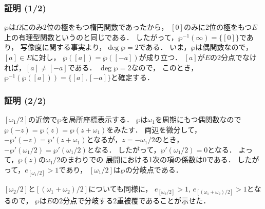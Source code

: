 \documentclass[dvipdfmx,12pt,aspectratio=169]{beamer}%
\begin{document}
\begin{frame}
    \frametitle{証明 (1/2)}

    $\wp$は$\Omega$にのみ2位の極をもつ楕円関数であったから，
    $[0]$のみに2位の極をもつ$E$上の有理型関数というのと同じである．
    したがって，$\wp^{-1}(\infty)=\{[0]\}$であり，
    写像度に関する事実より，$\deg\wp=2$である．
    いま，$\wp$は偶関数なので，$[a]\in E$に対し，
    $\wp([a])=\wp([-a])$が成り立つ．
    $[a]$が$E$の2分点でなければ，$[a]\neq[-a]$である．
    $\deg\wp=2$なので，
    このとき，$\wp^{-1}(\wp([a]))=\{[a],[-a]\}$と確定する．
\end{frame}

\begin{frame}
    \frametitle{証明 (2/2)}

    $[\omega_1/2]$の近傍で$\wp$を局所座標表示する．
    $\wp$は$\omega_1$を周期にもつ偶関数なので
    $\wp(-z)=\wp(z)=\wp(z+\omega_1)$をみたす．
    両辺を微分して，
    $-\wp'(-z)=\wp'(z+\omega_1)$となるが，$z=-\omega_1/2$のとき，
    $-\wp'(\omega_1/2)=\wp'(\omega_1/2)$となる．
    したがって，$\wp'(\omega_1/2)=0$となる．
    よって，$\wp(z)$の$\omega_1/2$のまわりでの
    展開における1次の項の係数は0である．
    したがって，$e_{[\omega_1/2]}>1$であり，
    $[\omega_1/2]$は$\wp$の分岐点である．
    
    $[\omega_2/2]$と$[(\omega_1+\omega_2)/2]$についても同様に，
    $e_{[\omega_2/2]}>1$, $e_{[(\omega_1+\omega_2)/2]}>1$となるので，
    $\wp$は$E$の2分点で分岐する2重被覆であることが示せた．

\end{frame}
    
\end{document}
